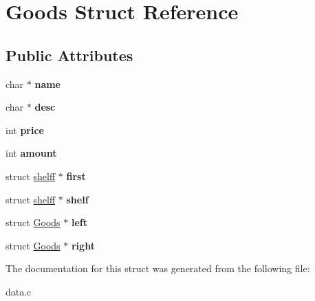 \hypertarget{structGoods}{\section{Goods Struct Reference}
\label{structGoods}
}
\subsection*{Public Attributes}
\begin{DoxyCompactItemize}
\item 
\hypertarget{structGoods_a10a587a1c8e7f70378704662c77cc543}{char $\ast$ {\bfseries name}}\label{structGoods_a10a587a1c8e7f70378704662c77cc543}

\item 
\hypertarget{structGoods_ab3291aef3419a074d8a27f75c3fd97b3}{char $\ast$ {\bfseries desc}}\label{structGoods_ab3291aef3419a074d8a27f75c3fd97b3}

\item 
\hypertarget{structGoods_a37df40a762a8b91f5c35ca2126a3ebdd}{int {\bfseries price}}\label{structGoods_a37df40a762a8b91f5c35ca2126a3ebdd}

\item 
\hypertarget{structGoods_a8d0e3618fe66b0aa7c72c759d64532ec}{int {\bfseries amount}}\label{structGoods_a8d0e3618fe66b0aa7c72c759d64532ec}

\item 
\hypertarget{structGoods_af35d9411d7a5558ae49adf4385dff4e2}{struct \hyperlink{structshelff}{shelff} $\ast$ {\bfseries first}}\label{structGoods_af35d9411d7a5558ae49adf4385dff4e2}

\item 
\hypertarget{structGoods_ad2d8933f0056f2773f26faf2dd8ff654}{struct \hyperlink{structshelff}{shelff} $\ast$ {\bfseries shelf}}\label{structGoods_ad2d8933f0056f2773f26faf2dd8ff654}

\item 
\hypertarget{structGoods_a4182c9a140f9b124f3f51e2613cf618b}{struct \hyperlink{structGoods}{Goods} $\ast$ {\bfseries left}}\label{structGoods_a4182c9a140f9b124f3f51e2613cf618b}

\item 
\hypertarget{structGoods_a57f3785ce0e7818d945eb33ce0197671}{struct \hyperlink{structGoods}{Goods} $\ast$ {\bfseries right}}\label{structGoods_a57f3785ce0e7818d945eb33ce0197671}

\end{DoxyCompactItemize}


The documentation for this struct was generated from the following file\-:\begin{DoxyCompactItemize}
\item 
data.\-c\end{DoxyCompactItemize}
